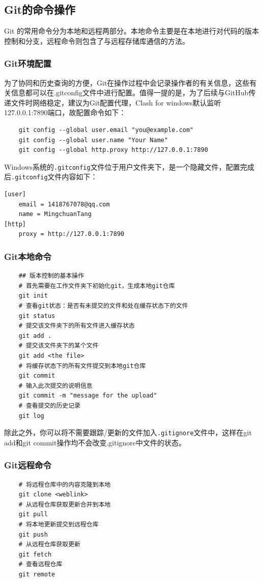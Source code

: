 \subsection{Git的命令操作}
Git 的常用命令分为本地和远程两部分。本地命令主要是在本地进行对代码的版本控制和分支，远程命令则包含了与远程存储库通信的方法。

\subsubsection{Git环境配置}
为了协同和历史查询的方便，Git在操作过程中会记录操作者的有关信息，这些有关信息都可以在.gitconfig文件中进行配置。值得一提的是，为了后续与GitHub传递文件时网络稳定，建议为Git配置代理，Clash for windows默认监听127.0.0.1:7890端口，故配置命令如下：
\begin{lstlisting}
    git config --global user.email "you@example.com"
    git config --global user.name "Your Name"
    git config --global http.proxy http://127.0.0.1:7890
\end{lstlisting}

Windows系统的\lstinline{.gitconfig}文件位于用户文件夹下，是一个隐藏文件，配置完成后\lstinline{.gitconfig}文件内容如下：
\begin{lstlisting}
[user]
	email = 1418767078@qq.com
	name = MingchuanTang
[http]
	proxy = http://127.0.0.1:7890
\end{lstlisting}

\subsubsection{Git本地命令}
\begin{lstlisting}
    ## 版本控制的基本操作
    # 首先需要在工作文件夹下初始化git，生成本地git仓库
    git init
    # 查看git状态：是否有未提交的文件和处在缓存状态下的文件
    git status
    # 提交该文件夹下的所有文件进入缓存状态
    git add .
    # 提交该文件夹下的某个文件
    git add <the file>
    # 将缓存状态下的所有文件提交到本地git仓库
    git commit
    # 输入此次提交的说明信息
    git commit -m "message for the upload"
    # 查看提交的历史记录
    git log
\end{lstlisting}

除此之外，你可以将不需要跟踪/更新的文件加入\lstinline{.gitignore}文件中，这样在git add和git commit操作均不会改变.gitignore中文件的状态。

\subsubsection{Git远程命令}
\label{remote-order}
\begin{lstlisting}
    # 将远程仓库中的内容克隆到本地
    git clone <weblink>
    # 从远程仓库获取更新合并到本地
    git pull
    # 将本地更新提交到远程仓库
    git push
    # 从远程仓库获取更新
    git fetch
    # 查看远程仓库
    git remote
\end{lstlisting}

